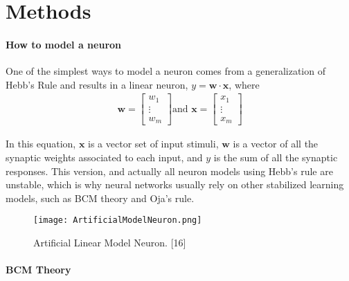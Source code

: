 \documentclass[10pt,twoside]{article}
\begin{document}
\section*{\centering Methods}

\paragraph*{How to model a neuron}     %
One of the simplest ways to model a neuron comes from a generalization
of Hebb's Rule and results in a linear neuron, $y = \mathbf{w} \cdot \mathbf{x}$, where
  \begin{align}
    \mathbf{w} = \begin{bmatrix}
           w_{1} \\
           \vdots \\
           w_{m}
         \end{bmatrix}
   \text{and   } \mathbf{x} = \begin{bmatrix}
           x_{1} \\
           \vdots \\
           x_{m}
         \end{bmatrix}
  \end{align}
 
\noindent In this equation, $\mathbf{x}$ is a vector set of input stimuli, $\mathbf{w}$
is a vector of all the synaptic weights associated to each input, 			%
and $y$ is the sum of all the synaptic responses. 
This version, and actually all neuron models using Hebb's rule
are unstable, which is why neural networks usually
rely on other stabilized learning models, such as BCM theory and Oja's rule.

\begin{figure}[H]\small\centering\label{fig3}
\texttt{[image: ArtificialModelNeuron.png]}
\caption{Artificial Linear Model Neuron. [16]}
\end{figure}

\paragraph*{BCM Theory}
\end{document}
